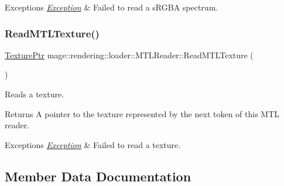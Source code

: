 \begin{DoxyExceptions}{Exceptions}
{\em \mbox{\hyperlink{classmage_1_1_exception}{Exception}}} & Failed to read a s\+R\+G\+BA spectrum. \\
\hline
\end{DoxyExceptions}
\mbox{\label{classmage_1_1rendering_1_1loader_1_1_m_t_l_reader_abf1609fbd22075fa4e692b7b6eab06fd}} 
\subsubsection{\texorpdfstring{Read\+M\+T\+L\+Texture()}{ReadMTLTexture()}}
{\footnotesize\ttfamily \mbox{\hyperlink{namespacemage_1_1rendering_a6f3ae54f825328465b0cdde0f0de4a36}{Texture\+Ptr}} mage\+::rendering\+::loader\+::\+M\+T\+L\+Reader\+::\+Read\+M\+T\+L\+Texture (\begin{DoxyParamCaption}{ }\end{DoxyParamCaption})\hspace{0.3cm}{\ttfamily [private]}}

Reads a texture.

\begin{DoxyReturn}{Returns}
A pointer to the texture represented by the next token of this M\+TL reader. 
\end{DoxyReturn}

\begin{DoxyExceptions}{Exceptions}
{\em \mbox{\hyperlink{classmage_1_1_exception}{Exception}}} & Failed to read a texture. \\
\hline
\end{DoxyExceptions}


\subsection{Member Data Documentation}
\mbox{\label{classmage_1_1rendering_1_1loader_1_1_m_t_l_reader_ae2fef19220c95fa5593fb43ea86c7293}} 
